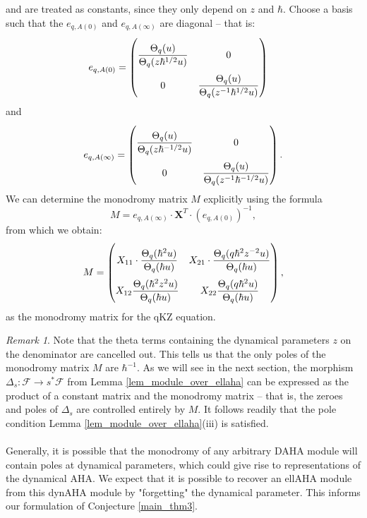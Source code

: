 \documentclass[a4paper]{report}
\theoremstyle{theorem}
\theoremstyle{definition}
\theoremstyle{remark}
\newtheorem{remark}{Remark}
\theoremstyle{proposition}
\theoremstyle{conjecture}
\theoremstyle{lemma}
\theoremstyle{corollary}
\theoremstyle{exercise}
\theoremstyle{example}
\newcommand{\mcal}{\mathcal}
\begin{document}
  and are treated as constants, since they only depend on $z$ and $\hbar$.
  Choose a basis such that the $e_{q,A(0)}$ and $e_{q,A(\infty)}$ are diagonal -- that is:
  \begin{align*}
      e_{q,A(0)} &= \renewcommand\arraystretch{2.5}\begin{pmatrix}
          \displaystyle\frac{\Theta_q(u)}{\Theta_q(z\hbar^{1/2}u)} & 0\\
          0 & \displaystyle\frac{\Theta_q(u)}{\Theta_q(z^{-1}\hbar^{1/2}u)}
          \end{pmatrix} 
  \end{align*}
  and 
  $$e_{q,A(\infty)} = \renewcommand\arraystretch{2.5}\begin{pmatrix}
      \displaystyle\frac{\Theta_q(u)}{\Theta_q(z\hbar^{-1/2}u)} & 0\\
      0 & \displaystyle\frac{\Theta_q(u)}{\Theta_q(z^{-1}\hbar^{-1/2}u)} 
  \end{pmatrix}.$$
  We can determine the monodromy matrix $M$ explicitly using the formula 
  $$M = e_{q,A(\infty)} \cdot \mathbf{X}^T \cdot \left(e_{q,A(0)}\right)^{-1},$$
  from which we obtain: 
  \begin{equation}\label{eqn_mon_matrix}
      M = \renewcommand\arraystretch{2.5}\begin{pmatrix}
          X_{11} \cdot \displaystyle\frac{\Theta_q(\hbar^2u)}{\Theta_q(\hbar u)} & X_{21} \cdot \displaystyle\frac{\Theta_q(q\hbar^2z^{-2}u)}{\Theta_q(\hbar u)} \\
          X_{12} \displaystyle\frac{\Theta_q(\hbar^2z^2u)}{\Theta_q(\hbar u)} & X_{22} \displaystyle\frac{\Theta_q(q\hbar^2u)}{\Theta_q(\hbar u)}
      \end{pmatrix},
  \end{equation}
  as the monodromy matrix for the qKZ equation. 
  \begin{remark}
      Note that the theta terms containing the dynamical parameters $z$ on the denominator are cancelled out. 
      This tells us that the only poles of the monodromy matrix $M$ are $\hbar^{-1}$. As we will see in the next section, the 
      morphism $\Delta_s : \mcal{F} \to s^\ast\mcal{F}$ from Lemma \ref{lem_module_over_ellaha} can be expressed 
      as the product of a constant matrix and the monodromy matrix -- that is, the zeroes and poles of $\Delta_s$ are controlled entirely by 
      $M$. It follows readily that the pole condition Lemma \ref{lem_module_over_ellaha}(iii) 
      is satisfied.\\\\
      Generally, it is possible 
      that the monodromy of any arbitrary DAHA module will contain poles at dynamical parameters, which could give 
      rise to representations of the dynamical AHA. We expect that it is possible to recover an ellAHA module from this 
      dynAHA module by "forgetting" the dynamical parameter. This informs our formulation of Conjecture \ref{main_thm3}.
  \end{remark}
\end{document}

